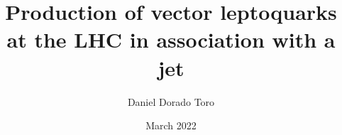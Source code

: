 \title{Production of vector leptoquarks at the LHC in association with a jet}
\author{Daniel Dorado Toro}
\date{March 2022}

\maketitle

